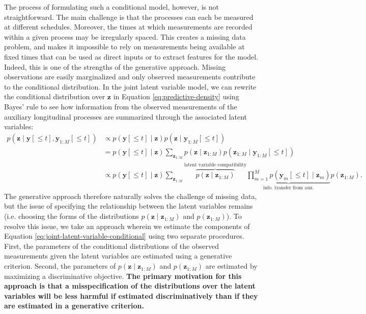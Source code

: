 \documentclass[12pt]{article}
\newcommand{\given}{\mid}
\begin{document}
The process of formulating such a conditional model, however, is not straightforward. The main challenge is that the processes can each be measured at different schedules. Moreover, the times at which measurements are recorded within a given process may be irregularly spaced. This creates a missing data problem, and makes it impossible to rely on measurements being available at fixed times that can be used as direct inputs or to extract features for the model. Indeed, this is one of the strengths of the generative approach. Missing observations are easily marginalized and only observed measurements contribute to the conditional distribution. In the joint latent variable model, we can rewrite the conditional distribution over $\bm{z}$ in Equation \ref{eq:predictive-density} using Bayes' rule to see how information from the observed measurements of the auxiliary longitudinal processes are summarized through the associated latent variables:
\begin{align}
\label{eq:target-latent-variable-predictive}
p(\bm{z} \given \bm{y}[\le t], \bm{y}_{1:M}[\le t])
	&\propto p(\bm{y}[\le t] \given \bm{z}) p(\bm{z} \given \bm{y}_{1:M}[\le t]) \\
\nonumber
	&=       p(\bm{y}[\le t] \given \bm{z}) \sum_{\bm{z}_{1:M}} p(\bm{z} \given \bm{z}_{1:M}) p(\bm{z}_{1:M} \given \bm{y}_{1:M}[\le t]) \\
\label{eq:joint-latent-variable-conditional}
	&\propto
		p(\bm{y}[\le t] \given \bm{z})
		\sum_{\bm{z}_{1:M}}
			\overbrace{p(\bm{z} \given \bm{z}_{1:M})}^{\text{latent variable compatibility}}
			\underbrace{\prod_{m=1}^M p(\bm{y}_m[\le t] \given \bm{z}_m)}_{\text{info. transfer from aux.}}
			p(\bm{z}_{1:M}).
\end{align}
The generative approach therefore naturally solves the challenge of missing data, but the issue of specifying the relationship between the latent variables remains (i.e. choosing the forms of the distributions $p(\bm{z} \given \bm{z}_{1:M})$ and $p(\bm{z}_{1:M})$). To resolve this issue, we take an approach wherein we estimate the components of Equation \ref{eq:joint-latent-variable-conditional} using two separate procedures. First, the parameters of the conditional distributions of the observed measurements given the latent variables are estimated using a generative criterion. Second, the parameters of $p(\bm{z} \given \bm{z}_{1:M})$ and $p(\bm{z}_{1:M})$ are estimated by maximizing a discriminative objective. \textbf{The primary motivation for this approach is that a misspecification of the distributions over the latent variables will be less harmful if estimated discriminatively than if they are estimated in a generative criterion.}
\end{document}
